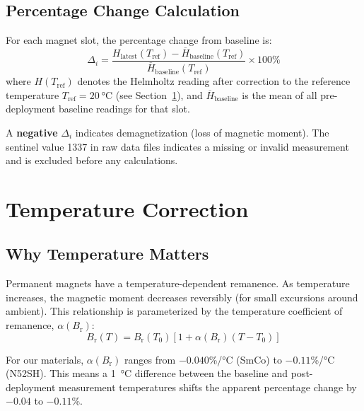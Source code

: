 \documentclass[11pt,letterpaper]{article}
\newcommand{\smco}{SmCo}
\newcommand{\Br}{B_\mathrm{r}}
\newcommand{\alphar}{\alpha(\Br)}
\begin{document}
\subsection{Percentage Change Calculation}

For each magnet slot, the percentage change from baseline is:
\begin{equation}
    \Delta_i = \frac{H_\mathrm{latest}(T_\mathrm{ref}) - \overline{H}_\mathrm{baseline}(T_\mathrm{ref})}{\overline{H}_\mathrm{baseline}(T_\mathrm{ref})} \times 100\%
    \label{eq:pct_change}
\end{equation}
where $H(T_\mathrm{ref})$ denotes the Helmholtz reading after correction to the
reference temperature $T_\mathrm{ref} = \SI{20}{\celsius}$ (see
Section~\ref{sec:temperature}), and $\overline{H}_\mathrm{baseline}$ is the
mean of all pre-deployment baseline readings for that slot.

A \textbf{negative} $\Delta_i$ indicates demagnetization (loss of magnetic
moment). The sentinel value 1337 in raw data files indicates a missing or
invalid measurement and is excluded before any calculations.

\section{Temperature Correction}
\label{sec:temperature}

\subsection{Why Temperature Matters}

Permanent magnets have a temperature-dependent remanence. As temperature
increases, the magnetic moment decreases reversibly (for small excursions around
ambient). This relationship is parameterized by the temperature coefficient of
remanence, $\alphar$:
\begin{equation}
    \Br(T) = \Br(T_0) \left[ 1 + \alphar (T - T_0) \right]
\end{equation}

For our materials, $\alphar$ ranges from $-0.040$\%/\si{\celsius} (\smco{})
to $-0.11$\%/\si{\celsius} (N52SH). This means a \SI{1}{\celsius} difference
between the baseline and post-deployment measurement temperatures shifts the
apparent percentage change by $-0.04$ to $-0.11$\%.
\end{document}
